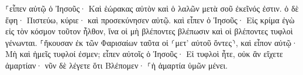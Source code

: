 \documentclass{openreader}
\begin{document}
⸀εἶπεν αὐτῷ ὁ Ἰησοῦς· Καὶ ἑώρακας αὐτὸν καὶ ὁ λαλῶν μετὰ σοῦ ἐκεῖνός ἐστιν. 
ὁ δὲ ἔφη· Πιστεύω, κύριε· καὶ προσεκύνησεν αὐτῷ. 
καὶ εἶπεν ὁ Ἰησοῦς· Εἰς κρίμα ἐγὼ εἰς τὸν κόσμον τοῦτον ἦλθον, ἵνα οἱ μὴ βλέποντες βλέπωσιν καὶ οἱ βλέποντες τυφλοὶ γένωνται. 
⸀ἤκουσαν ἐκ τῶν Φαρισαίων ταῦτα οἱ ⸂μετ’ αὐτοῦ ὄντες⸃, καὶ εἶπον αὐτῷ· Μὴ καὶ ἡμεῖς τυφλοί ἐσμεν; 
εἶπεν αὐτοῖς ὁ Ἰησοῦς· Εἰ τυφλοὶ ἦτε, οὐκ ἂν εἴχετε ἁμαρτίαν· νῦν δὲ λέγετε ὅτι Βλέπομεν· ⸀ἡ ἁμαρτία ὑμῶν μένει. 
\end{document}
